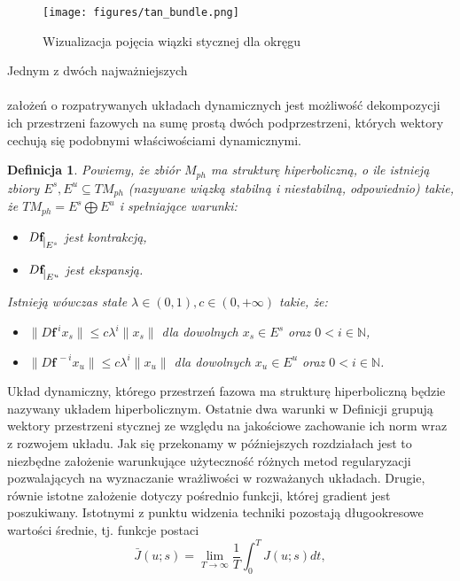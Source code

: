 \documentclass[12pt]{article}
\newtheorem{defi}{Definicja}
\begin{document}
\begin{figure}[H]
	\texttt{[image: figures/tan\_bundle.png]} 
	\centering
	\caption{Wizualizacja pojęcia wiązki stycznej dla okręgu}
\end{figure}
Jednym z dwóch najważniejszych
\\\\ założeń o rozpatrywanych układach dynamicznych jest możliwość dekompozycji ich przestrzeni fazowych na sumę prostą dwóch podprzestrzeni, których wektory cechują się podobnymi właściwościami dynamicznymi.
\begin{defi}\label{hyperbolic_set}
	Powiemy, że zbiór $M_{ph}$ ma strukturę hiperboliczną, o ile istnieją zbiory $ E^{s},E^{u} \subseteq TM_{ph}$ (nazywane wiązką stabilną i niestabilną, odpowiednio) takie, że $ TM_{ph} = E^{s} \bigoplus E^{u}$ i spełniające warunki:
	\begin{itemize}
		\item $ D\textbf{f}_{\mkern 1mu \vrule height 2ex\mkern2mu E^{s}} $ jest kontrakcją,
		\item $ D\textbf{f}_{\mkern 1mu \vrule height 2ex\mkern2mu E^{u}} $ jest ekspansją.
	\end{itemize}
	Istnieją wówczas stałe $ \lambda \in (0,1), c \in (0,+\infty) $ takie, że:
	\begin{itemize}
		\item $ \| D\textbf{f}^{\ i}x_{s}\| \leq c\lambda^{i} \| x_{s}\|$ dla dowolnych $ x_{s} \in E^{s} $ oraz $ 0 < i \in \mathbb{N} $,
		\item $ \| D\textbf{f}^{\ -i}x_{u}\| \leq c\lambda^{i} \| x_{u}\|$ dla dowolnych $ x_{u} \in E^{u} $ oraz $ 0 < i \in \mathbb{N} $.
	\end{itemize}
\end{defi}
Układ dynamiczny, którego przestrzeń fazowa ma strukturę hiperboliczną będzie nazywany układem hiperbolicznym. Ostatnie dwa warunki w Definicji grupują wektory przestrzeni stycznej ze względu na jakościowe zachowanie ich norm wraz z rozwojem układu. Jak się przekonamy w późniejszych rozdziałach jest to niezbędne założenie warunkujące użyteczność różnych metod regularyzacji pozwalających na wyznaczanie wrażliwości w rozważanych układach. \newline
Drugie, równie istotne założenie dotyczy pośrednio funkcji, której gradient jest poszukiwany. Istotnymi z punktu widzenia techniki pozostają długookresowe wartości średnie, tj. funkcje postaci
\begin{equation}
\bar{J}(u;s) = \lim\limits_{T \rightarrow \infty}\frac{1}{T}\int_{0}^{T}J(u;s)dt,
\label{J_bar}
\end{equation}
\end{document}
